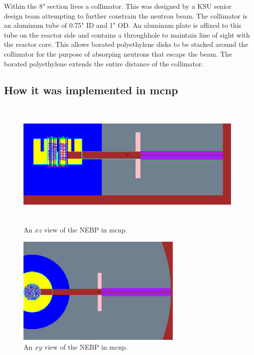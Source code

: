 Within the 8" section lives a collimator.
This was designed by a KSU senior design team attempting to further constrain the neutron beam.
The collimator is an aluminum tube of 0.75" ID and 1" OD.
An aluminum plate is affixed to this tube on the reactor side and contains a throughhole to maintain line of sight with the reactor core.
This allows borated polyethylene disks to be stacked around the collimator for the purpose of absorping neutrons that escape the beam.
The borated polyethylene extends the entire distance of the collimator. 


\subsection{How it was implemented in mcnp}

\begin{figure}[htb]
\centering
\includegraphics[height=2.5in]{tex/figures/mcnp_newxz.png}
\caption[MCNP NEBP $XZ$]{An $xz$ view of the NEBP in mcnp.}
\label{fig:mcnp_newxz}
\end{figure}

\begin{figure}[htb]
\centering
\includegraphics[trim={0 1.5in 0 1.7in}, clip, height=2.1in]{tex/figures/mcnp_newxy.png}
\caption[MCNP NEBP $XY$]{An $xy$ view of the NEBP in mcnp.}
\label{fig:mcnp_newxy}
\end{figure}





